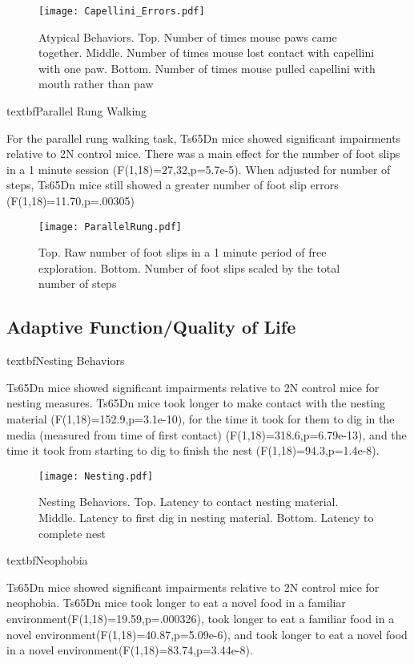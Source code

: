 \documentclass{article}
\begin{document}
\begin{figure}[h!]
\centering
\texttt{[image: Capellini\_Errors.pdf]}
\caption{Atypical Behaviors. Top. Number of times mouse paws came together. Middle. Number of times mouse lost contact with capellini with one paw. Bottom. Number of times mouse pulled capellini with mouth rather than paw}
\label{fig:CapelliniErrors}
\end{figure}

textbf{Parallel Rung Walking}

For the parallel rung walking task, Ts65Dn mice showed significant impairments relative to 2N control mice. There was a main effect for the number of foot slips in a 1 minute session (F(1,18)=27,32,p=5.7e-5).  When adjusted for number of steps, Ts65Dn mice still showed a greater number of foot slip errors (F(1,18)=11.70,p=.00305)

\begin{figure}[h!]
\centering
\texttt{[image: ParallelRung.pdf]}
\caption{Top. Raw number of foot slips in a 1 minute period of free exploration. Bottom. Number of foot slips scaled by the total number of steps}
\label{fig:ParallelRung}
\end{figure}

\subsection{Adaptive Function/Quality of Life}

textbf{Nesting Behaviors}

Ts65Dn mice showed significant impairments relative to 2N control mice for nesting measures. Ts65Dn mice took longer to make contact with the nesting material (F(1,18)=152.9,p=3.1e-10), for the time it took for them to dig in the media (measured from time of first contact) (F(1,18)=318.6,p=6.79e-13), and the time it took from starting to dig to finish the nest (F(1,18)=94.3,p=1.4e-8).

\begin{figure}[h!]
\centering
\texttt{[image: Nesting.pdf]}
\caption{Nesting Behaviors. Top. Latency to contact nesting material. Middle. Latency to first dig in nesting material. Bottom. Latency to complete nest}
\label{fig:Nesting}
\end{figure}

textbf{Neophobia}

Ts65Dn mice showed significant impairments relative to 2N control mice for neophobia. Ts65Dn mice took longer to eat a novel food in a familiar environment(F(1,18)=19.59,p=.000326), took longer to eat a familiar food in a novel environment(F(1,18)=40.87,p=5.09e-6), and took longer to eat a novel food in a novel environment(F(1,18)=83.74,p=3.44e-8).
\end{document}
